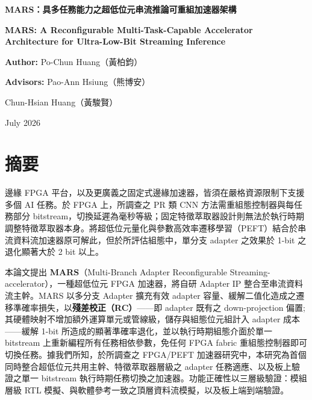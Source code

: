 \documentclass[12pt, a4paper]{report}
\numberwithin{equation}{chapter}
\numberwithin{figure}{chapter}
\numberwithin{table}{chapter}
\numberwithin{algorithm}{chapter}
\newcommand{\ZhTitle}{MARS：具多任務能力之超低位元串流推論可重組加速器架構}
\newcommand{\EnTitle}{MARS: A Reconfigurable Multi-Task-Capable Accelerator Architecture for Ultra-Low-Bit Streaming Inference}
\newcommand{\AuthorName}{Po-Chun Huang（黃柏鈞）}
\newcommand{\AdvisorA}{Pao-Ann Hsiung（熊博安）}
\newcommand{\AdvisorB}{Chun-Hsian Huang（黃駿賢）}
\newcommand{\ReportDate}{July 2026}
\begin{document}
\begin{titlepage}
    \centering
    \vspace*{1.0cm}

    {\LARGE \bfseries \ZhTitle \par}
    \vspace{0.8cm}

    {\Large \bfseries \EnTitle \par}
    \vspace{2.0cm}

    {\large \textbf{Author:} \AuthorName \par}
    \vspace{0.5cm}
    {\large \textbf{Advisors:} \AdvisorA \par}
    \vspace{0.2cm}
    {\large {}\AdvisorB \par}
    \vspace{0.5cm}
    {\large \ReportDate \par}

    \vfill
\end{titlepage}

\clearpage
\section*{\centering 摘要}
邊緣 FPGA 平台，以及更廣義之固定式邊緣加速器，皆須在嚴格資源限制下支援多個 AI 任務。於 FPGA 上，所調查之 PR 類 CNN 方法需重組態控制器與每任務部分 bitstream，切換延遲為毫秒等級；固定特徵萃取器設計則無法於執行時期調整特徵萃取器本身。將超低位元量化與參數高效率遷移學習（PEFT）結合於串流資料流加速器原可解此，但於所評估組態中，單分支 adapter 之效果於 1-bit 之退化顯著大於 2 bit 以上。

本論文提出 \textbf{MARS}（Multi-Branch Adapter Reconfigurable Streaming-accelerator），一種超低位元 FPGA 加速器，將自研 Adapter IP 整合至串流資料流主幹。MARS 以多分支 Adapter 擴充有效 adapter 容量、緩解二值化造成之遷移準確率損失，以\textbf{殘差校正（RC）}——即 adapter 既有之 down-projection 偏置;其硬體映射不增加額外運算單元或管線級，儲存與組態位元組計入 adapter 成本——緩解 1-bit 所造成的顯著準確率退化，並以執行時期組態介面於單一 bitstream 上重新編程所有任務相依參數，免任何 FPGA fabric 重組態控制器即可切換任務。據我們所知，於所調查之 FPGA/PEFT 加速器研究中，本研究為首個同時整合超低位元共用主幹、特徵萃取器層級之 adapter 任務適應、以及板上驗證之單一 bitstream 執行時期任務切換之加速器。功能正確性以三層級驗證：模組層級 RTL 模擬、與軟體參考一致之頂層資料流模擬，以及板上端到端驗證。
\end{document}
